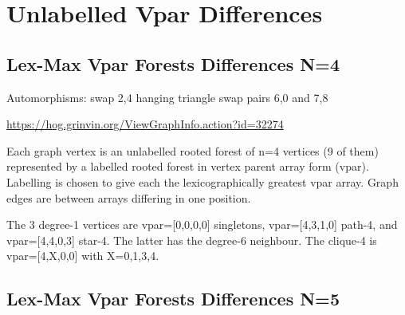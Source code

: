 \documentclass{article}
\begin{document}
\clearpage
\section{Unlabelled Vpar Differences}

\subsection{Lex-Max Vpar Forests Differences N=4}


Automorphisms: \newline
swap 2,4 hanging triangle \newline
swap pairs 6,0 and 7,8

\url{https://hog.grinvin.org/ViewGraphInfo.action?id=32274}

Each graph vertex is an unlabelled rooted forest of n=4 vertices (9 of
them) represented by a labelled rooted forest in vertex parent array
form (vpar).  Labelling is chosen to give each the lexicographically
greatest vpar array.  Graph edges are between arrays differing in one
position.

The 3 degree-1 vertices are vpar=[0,0,0,0] singletons, vpar=[4,3,1,0]
path-4, and vpar=[4,4,0,3] star-4.  The latter has the degree-6
neighbour.  The clique-4 is vpar=[4,X,0,0] with X=0,1,3,4.


\begin{center}
\end{center}

\subsection{Lex-Max Vpar Forests Differences N=5}
\end{document}
